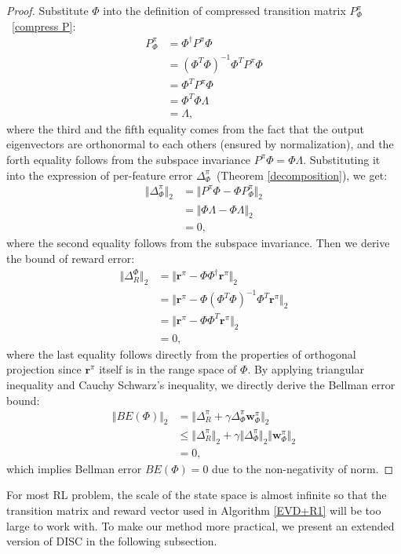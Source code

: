 \documentclass[onecolumn, conference]{IEEEtran}
\begin{document}
\begin{proof}
Substitute $\Phi$ into the definition of compressed transition matrix $P_\Phi^\pi$~\eqref{compress P}:
\begin{align*}
    P_\Phi^\pi &= \Phi^\dagger P^\pi\Phi\\
    &= (\Phi^T\Phi)^{-1}\Phi^T P^\pi\Phi\\
    &= \Phi^T P^\pi\Phi\\
    &=\Phi^T \Phi \Lambda\\
    &= \Lambda,
\end{align*}
where the third and the fifth equality comes from the fact that the output eigenvectors are orthonormal to each others (ensured by normalization), and the forth equality follows from the subspace invariance $P^\pi \Phi = \Phi\Lambda$. Substituting it into the expression of per-feature error $\Delta_\Phi^\pi$~(Theorem \ref{decomposition}), we get:
\begin{align*}
    \Vert \Delta_\Phi^\pi \Vert_2 &= \Vert P^\pi \Phi - \Phi P_\Phi^\pi \Vert_2\\
    &= \Vert \Phi \Lambda - \Phi \Lambda \Vert_2\\
    &= 0,
\end{align*}
where the second equality follows from the subspace invariance. Then we derive the bound of reward error: 
\begin{align*}
	\Vert\Delta_R^\Phi \Vert_2 & = \Vert \boldsymbol{r}^\pi -\Phi\Phi^\dagger \boldsymbol{r}^\pi \Vert_2\\
	& = \Vert \boldsymbol{r}^\pi - \Phi(\Phi^T\Phi)^{-1}\Phi^T \boldsymbol{r}^\pi \Vert_2\\
	&=  \Vert \boldsymbol{r}^\pi - \Phi\Phi^T \boldsymbol{r}^\pi \Vert_2\\
	&=0,
\end{align*}
where the last equality follows directly from the properties of orthogonal projection since $\boldsymbol{r}^\pi$ itself is in the range space of $\Phi$. By applying triangular inequality and Cauchy Schwarz's inequality, we directly derive the Bellman error bound:
\begin{align*}
    \Vert BE(\Phi)\Vert_2 &= \Vert \Delta_R^{\pi} +\gamma \Delta_\Phi^\pi \boldsymbol{w}_\Phi^{\pi}\Vert_2\\
    &\le \Vert \Delta_R^{\pi}\Vert_2 + \gamma\Vert \Delta_\Phi^\pi\Vert_2 \Vert \boldsymbol{w}_\Phi^\pi\Vert_2\\
    &=0,
\end{align*}
which implies Bellman error $BE(\Phi) =0$ due to the non-negativity of norm. 
\end{proof}
For most RL problem, the scale of the state space is almost infinite so that the transition matrix and reward vector used in Algorithm \ref{EVD+R1} will be too large to work with. To make our method more practical, we present an extended version of DISC in the following subsection.
\end{document}
